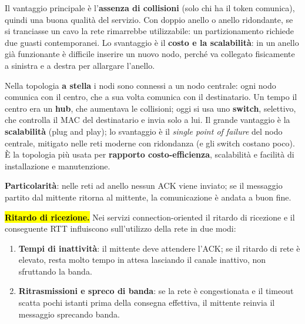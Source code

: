 \documentclass[11pt,a4paper]{report}
\begin{document}
Il vantaggio principale è l'\textbf{assenza di collisioni} (solo chi ha il token comunica), quindi una buona qualità del servizio. Con doppio anello o anello ridondante, se si tranciasse un cavo la rete rimarrebbe utilizzabile: un partizionamento richiede due guasti contemporanei. Lo svantaggio è il \textbf{costo e la scalabilità}: in un anello già funzionante è difficile inserire un nuovo nodo, perché va collegato fisicamente a sinistra e a destra per allargare l'anello.

Nella topologia \textbf{a stella} i nodi sono connessi a un nodo centrale: ogni nodo comunica con il centro, che a sua volta comunica con il destinatario. Un tempo il centro era un \textbf{hub}, che aumentava le collisioni; oggi si usa uno \textbf{switch}, selettivo, che controlla il MAC del destinatario e invia solo a lui. Il grande vantaggio è la \textbf{scalabilità} (plug and play); lo svantaggio è il \emph{single point of failure} del nodo centrale, mitigato nelle reti moderne con ridondanza (e gli switch costano poco). È la topologia più usata per \textbf{rapporto costo-efficienza}, scalabilità e facilità di installazione e manutenzione.

\textbf{Particolarità}: nelle reti ad anello nessun ACK viene inviato; se il messaggio partito dal mittente ritorna al mittente, la comunicazione è andata a buon fine.

\hl{\textbf{Ritardo di ricezione.}} Nei servizi connection-oriented il ritardo di ricezione e il conseguente RTT influiscono sull'utilizzo della rete in due modi:
\begin{enumerate}[noitemsep]
\item \textbf{Tempi di inattività}: il mittente deve attendere l'ACK; se il ritardo di rete è elevato, resta molto tempo in attesa lasciando il canale inattivo, non sfruttando la banda.
\item \textbf{Ritrasmissioni e spreco di banda}: se la rete è congestionata e il timeout scatta pochi istanti prima della consegna effettiva, il mittente reinvia il messaggio sprecando banda.
\end{enumerate}
\end{document}

